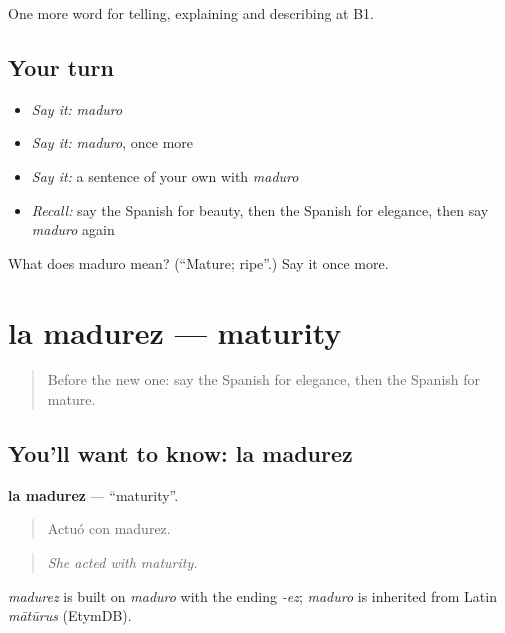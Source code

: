 \begin{grammarlens}[title={What you've built}]
One more word for telling, explaining and describing at B1.
\end{grammarlens}

\subsection*{Your turn}
\begin{itemize}
\raggedright
  \item \emph{Say it:} \emph{maduro}
  \item \emph{Say it:} \emph{maduro}, once more
  \item \emph{Say it:} a sentence of your own with \emph{maduro}
  \item \emph{Recall:} say the Spanish for beauty, then the Spanish for elegance, then say \emph{maduro} again
\end{itemize}

\begin{tcolorbox}[breakable,colback=teal!4,colframe=teal!35!black,title={Before you move on}]
What does maduro mean? (\textquotedblleft{}Mature; ripe\textquotedblright{}.) Say it once more.
\end{tcolorbox}
\section[la madurez]{la madurez — maturity}

\label{lesson:ES-C731-madurez}



\begin{quote}
Before the new one: say the Spanish for elegance, then the Spanish for mature.
\end{quote}

\subsection*{You'll want to know: la madurez}
\textbf{la madurez} — \textquotedblleft{}maturity\textquotedblright{}.

\begin{quote}
Actuó con madurez.
\end{quote}

\begin{quote}
\emph{She acted with maturity.}
\end{quote}

\begin{cousinweb}
\emph{madurez} is built on \emph{maduro} with the ending \emph{-ez}; \emph{maduro} is inherited from Latin \emph{mātūrus} (EtymDB).
\end{cousinweb}

